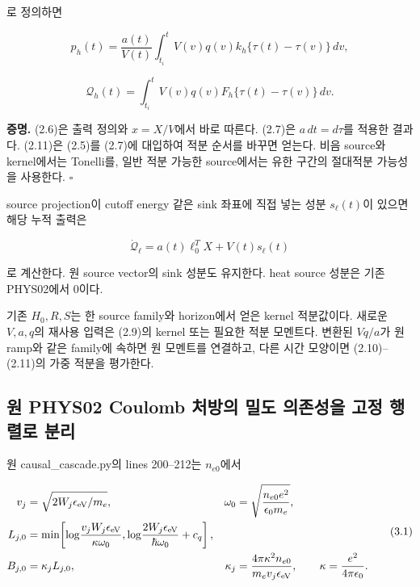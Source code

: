 로 정의하면

\[
p_h(t)=\frac{a(t)}{V(t)}
\int_{t_i}^{t}V(v)q(v)
k_h\{\tau(t)-\tau(v)\}\,dv,
\tag{2.10}
\]

\[
\boxed{
\mathcal Q_h(t)=
\int_{t_i}^{t}V(v)q(v)
F_h\{\tau(t)-\tau(v)\}\,dv.
}
\tag{2.11}
\]

\textbf{증명.} (2.6)은 출력 정의와 \(x=X/V\)에서 바로 따른다. (2.7)은 \(a\,dt=d\tau\)를 적용한 결과다. (2.11)은 (2.5)를 (2.7)에 대입하여 적분 순서를 바꾸면 얻는다. 비음 source와 kernel에서는 Tonelli를, 일반 적분 가능한 source에서는 유한 구간의 절대적분 가능성을 사용한다. \(\square\)

source projection이 cutoff energy 같은 sink 좌표에 직접 넣는 성분 \(s_\ell(t)\)이 있으면 해당 누적 출력은

\[
\dot{\mathcal Q}_\ell
=a(t)\ell_0^TX+V(t)s_\ell(t)
\tag{2.12}
\]

로 계산한다. 원 source vector의 sink 성분도 유지한다. heat source 성분은 기존 PHYS02에서 0이다.

기존 \(H_0,R,S\)는 한 source family와 horizon에서 얻은 kernel 적분값이다. 새로운 \(V,a,q\)의 재사용 입력은 (2.9)의 kernel 또는 필요한 적분 모멘트다. 변환된 \(Vq/a\)가 원 ramp와 같은 family에 속하면 원 모멘트를 연결하고, 다른 시간 모양이면 (2.10)--(2.11)의 가중 적분을 평가한다.

\hypertarget{uxc6d0-phys02-coulomb-uxcc98uxbc29uxc758-uxbc00uxb3c4-uxc758uxc874uxc131uxc744-uxace0uxc815-uxd589uxb82cuxb85c-uxbd84uxb9ac}{%
\subsection{원 PHYS02 Coulomb 처방의 밀도 의존성을 고정 행렬로 분리}\label{uxc6d0-phys02-coulomb-uxcc98uxbc29uxc758-uxbc00uxb3c4-uxc758uxc874uxc131uxc744-uxace0uxc815-uxd589uxb82cuxb85c-uxbd84uxb9ac}}

원 causal\_cascade.py의 lines 200--212는 \(n_{e0}\)에서

\[
\begin{aligned}
v_j&=\sqrt{2W_j\epsilon_{\rm eV}/m_e},&
\omega_0&=\sqrt{\frac{n_{e0}e^2}{\epsilon_0m_e}},\\
L_{j,0}&=\min\!\left[
\log\!\frac{v_jW_j\epsilon_{\rm eV}}{\kappa\omega_0},
\log\!\frac{2W_j\epsilon_{\rm eV}}{\hbar\omega_0}+c_q
\right],\\
B_{j,0}&=\kappa_jL_{j,0},&
\kappa_j&=\frac{4\pi\kappa^2n_{e0}}{m_ev_j\epsilon_{\rm eV}},
\qquad
\kappa=\frac{e^2}{4\pi\epsilon_0}.
\end{aligned}
\tag{3.1}
\]

